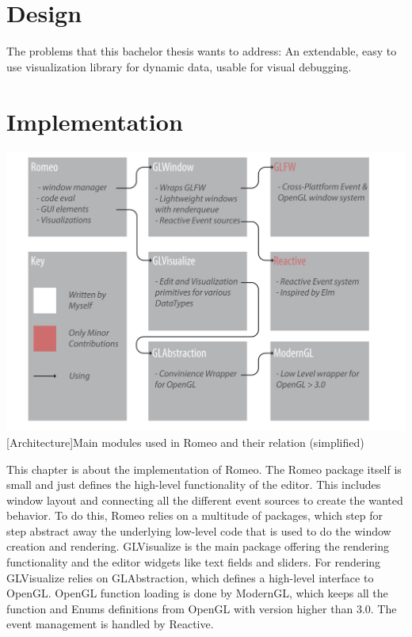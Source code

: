 \section{Design}
The problems that this bachelor thesis wants to address:
An extendable, easy to use visualization library for dynamic data, usable for visual debugging.



\section{Implementation}

\vspace{1em}
\begin{minipage}{\linewidth}
    \centering
    \includegraphics[width=0.9\linewidth]{graphics/architecture.pdf}
    [Architecture]{Main modules used in Romeo and their relation (simplified)}
    \label{fig:architecture} 
\end{minipage}


This chapter is about the implementation of Romeo.
The Romeo package itself is small and just defines the high-level functionality of the editor.
This includes window layout and connecting all the different event sources to create the wanted behavior.
To do this, Romeo relies on a multitude of packages, which step for step abstract away the underlying low-level code that is used to do the window creation and rendering.
GLVisualize is the main package offering the rendering functionality and the editor widgets like text fields and sliders.
For rendering GLVisualize relies on GLAbstraction, which defines a high-level interface to OpenGL.
OpenGL function loading is done by ModernGL, which keeps all the function and Enums definitions from OpenGL with version higher than 3.0.
The event management is handled by Reactive.

